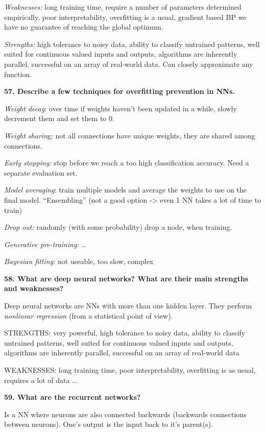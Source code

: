 \textit{Weaknesses:} long training time, require a number of
parameters determined empirically, poor interpretability, overfitting is
a usual, gradient based BP we have no guarantee of reaching the global
optimum.

\textit{Strengths:} high tolerance to noisy data, ability to classify
untrained patterns, well suited for continuous valued inputs and
outputs, algorithms are inherently parallel, successful on an array of
real-world data. Can closely approximate any function.

\textbf{57. Describe a few techniques for overfitting prevention in
NNs.}

\textit{Weight decay}: over time if weights haven't been updated in a
while, slowly decrement them and set them to 0.

\textit{Weight sharin}g: not all connections have unique weights,
they are shared among connections.

\textit{Early stopping:} stop before we reach a too high
classification accuracy. Need a separate evaluation set.

\textit{Model averaging}: train multiple models and average the
weights to use on the final model. ``Ensembling'' (not a good option
-\textgreater{} even 1 NN takes a lot of time to train)

\textit{Drop out:} randomly (with some probability) drop a node, when
training.

\textit{Generative pre-training:} \ldots{}

\textit{Bayesian fitting:} not useable, too slow, complex

\textbf{58. What are deep neural networks? What are their main strengths
and weaknesses?}

Deep neural networks are NNs with more than one hidden layer. They
perform \emph{nonlinear regression} (from a statistical point of view).

STRENGTHS: very powerful, high tolerance to noisy data, ability to
classify untrained patterns, well suited for continuous valued inputs
and outputs, algorithms are inherently parallel, successful on an array
of real-world data

WEAKNESSES: long training time, poor interpretability, overfitting is as
usual, requires a lot of data ...

\textbf{59. What are the recurrent networks?}

Is a NN where neurons are also connected backwards (backwards
connections between neurons). One's output is the input back to it's
parent(s).

